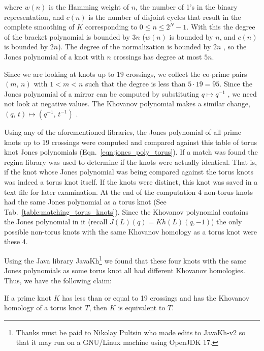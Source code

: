 where $w(n)$ is the Hamming weight of $n$, the number of 1's in the
binary representation, and $c(n)$ is the number of disjoint cycles
that result in the complete smoothing of $K$ corresponding to
$0\leq{n}\leq{2}^{N}-1$. With this the degree of the bracket polynomial
is bounded by $3n$ ($w(n)$ is bounded by $n$, and $c(n)$ is bounded
by $2n$). The degree of the normalization is bounded by $2n$
\cite{barnatan2002khovanov}, so the
Jones polynomial of a knot with $n$ crossings has degree at most $5n$.
\par\hfill\par
Since we are looking at knots up to $19$ crossings, we collect the
co-prime pairs $(m,\,n)$ with $1<m<n$ such that the degree
is less than $5\cdot{19}=95$. Since the Jones polynomial of a mirror
can be computed by substituting $q\mapsto{q}^{-1}$
\cite{jonespolyjones}, we need not look at
negative values. The Khovanov polynomial makes a similar change,
$(q,\,t)\mapsto(q^{-1},\,t^{-1})$
\cite{WATSON2017915}.
\par\hfill\par
Using any of the aforementioned libraries, the Jones polynomial of all
prime knots up to 19 crossings were computed and compared against this
table of torus knot Jones polynomials (Eqn.~\ref{eqn:jones_poly_torus}).
If a match was found the regina library was used to determine if the
knots were actually identical. That is, if the knot whose Jones
polynomial was being compared against the torus knots was indeed a
torus knot itself. If the knots were distinct, this knot was saved in a
text file for later examination. At the end of the computation 4
non-torus knots had the same Jones polynomial as a torus knot
(See Tab.~\ref{table:matching_torus_knots}).
Since the Khovanov polynomial contains the Jones polynomial in it
(recall $J(L)(q)=Kh(L)(q,-1)$) the only possible non-torus knots with
the same Khovanov homology as a torus knot were these 4.
\par\hfill\par
Using the Java library JavaKh\footnote{%
    Thanks must be paid to Nikolay Pultsin who made edits to
    JavaKh-v2 so that it may run on a GNU/Linux machine using
    OpenJDK 17.
}
we found that these four knots with the same Jones polynomials as some
torus knot all had different Khovanov homologies. Thus, we have the
following claim:
\begin{theorem}
    If a prime knot $K$ has less than or equal to 19 crossings and has
    the Khovanov homology of a torus knot $T$,
    then $K$ is equivalent to $T$.
\end{theorem}
